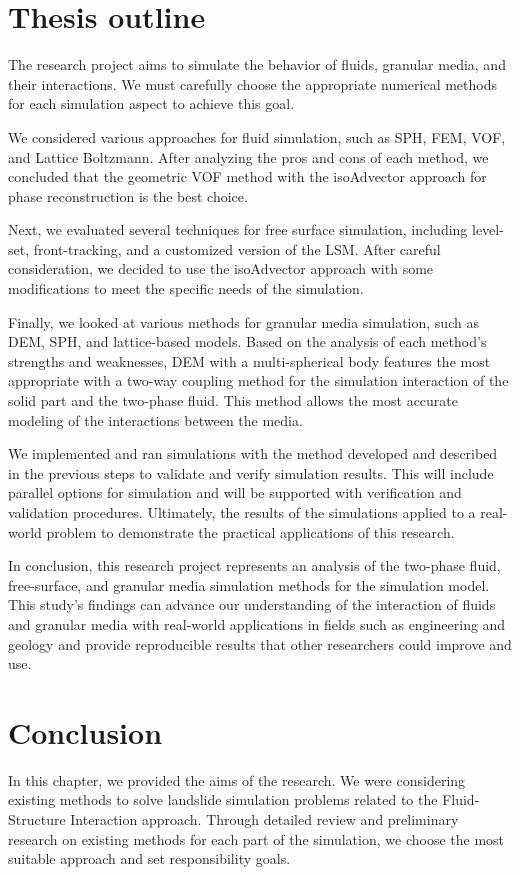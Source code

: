 \section{Thesis outline}

The research project aims to simulate the behavior of fluids, granular media, and their interactions. We must carefully choose the appropriate numerical methods for each simulation aspect to achieve this goal.

We considered various approaches for fluid simulation, such as SPH, FEM, VOF, and Lattice Boltzmann. After analyzing the pros and cons of each method, we concluded that the geometric VOF method with the isoAdvector approach for phase reconstruction is the best choice.

Next, we evaluated several techniques for free surface simulation, including level-set, front-tracking, and a customized version of the LSM. After careful consideration, we decided to use the isoAdvector approach with some modifications to meet the specific needs of the simulation.

Finally, we looked at various methods for granular media simulation, such as DEM, SPH, and lattice-based models. Based on the analysis of each method's strengths and weaknesses, DEM with a multi-spherical body features the most appropriate with a two-way coupling method for the simulation interaction of the solid part and the two-phase fluid. This method allows the most accurate modeling of the interactions between the media.

We implemented and ran simulations with the method developed and described in the previous steps to validate and verify simulation results. This will include parallel options for simulation and will be supported with verification and validation procedures.
Ultimately, the results of the simulations applied to a real-world problem to demonstrate the practical applications of this research.

In conclusion, this research project represents an analysis of the two-phase fluid, free-surface, and granular media simulation methods for the simulation model. This study's findings can advance our understanding of the interaction of fluids and granular media with real-world applications in fields such as engineering and geology and provide reproducible results that other researchers could improve and use.

\section{Conclusion}

In this chapter, we provided the aims of the research. We were considering existing methods to solve landslide simulation problems related to the Fluid-Structure Interaction approach. Through detailed review and preliminary research on existing methods for each part of the simulation, we choose the most suitable approach and set responsibility goals. 
